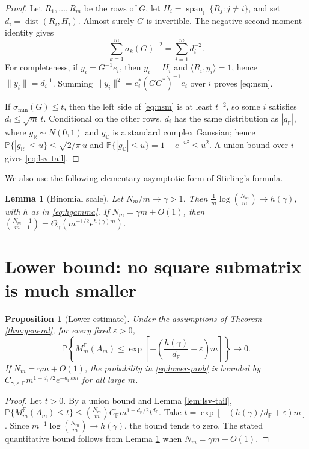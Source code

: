 \documentclass[10pt,a4paper]{amsart}
\newtheorem{proposition}[theorem]{Proposition}
\newtheorem{lemma}[theorem]{Lemma}
\DeclareMathOperator{\dist}{dist}
\newcommand{\R}{\mathbb{R}}
\newcommand{\C}{\mathbb{C}}
\newcommand{\F}{\mathbb{F}}
\newcommand{\PP}{\mathbb{P}}
\begin{document}
\begin{proof}
Let $R_1,\ldots,R_m$ be the rows of $G$, let $H_i=\operatorname{span}_\F\{R_j:j\ne i\}$, and set
$d_i=\dist(R_i,H_i)$. Almost surely $G$ is invertible. The negative second moment identity gives
\begin{equation}\label{eq:nsm}
  \sum_{k=1}^m \sigma_k(G)^{-2}=\sum_{i=1}^m d_i^{-2}.
\end{equation}
For completeness, if $y_i=G^{-1}e_i$, then $y_i\perp H_i$ and $\langle R_i,y_i\rangle=1$, hence
$\|y_i\|=d_i^{-1}$. Summing $\|y_i\|^2=e_i^*(GG^*)^{-1}e_i$ over $i$ proves \eqref{eq:nsm}.

If $\sigma_{\min}(G)\le t$, then the left side of \eqref{eq:nsm} is at least $t^{-2}$, so some $i$
satisfies $d_i\le \sqrt m\,t$. Conditional on the other rows, $d_i$ has the same distribution as
$|g_\F|$, where $g_\R\sim N(0,1)$ and $g_\C$ is a standard complex Gaussian; hence
$\PP\{|g_\R|\le u\}\le \sqrt{2/\pi}\,u$ and $\PP\{|g_\C|\le u\}=1-e^{-u^2}\le u^2$. A union bound over
$i$ gives \eqref{eq:lsv-tail}.
\end{proof}

We also use the following elementary asymptotic form of Stirling's formula.

\begin{lemma}[Binomial scale]\label{lem:binomial}
Let $N_m/m\to\gamma>1$. Then $\frac1m\log \binom{N_m}{m}\to h(\gamma)$, with $h$ as in
\eqref{eq:hgamma}. If $N_m=\gamma m+O(1)$, then
$\binom{N_m-1}{m-1}=\Theta_\gamma(m^{-1/2}e^{h(\gamma)m})$.
\end{lemma}

\section{Lower bound: no square submatrix is much smaller}

\begin{proposition}[Lower estimate]\label{prop:lower}
Under the assumptions of Theorem \ref{thm:general}, for every fixed $\varepsilon>0$,
\begin{equation}\label{eq:lower-prob}
  \PP\left\{M_m^\F(A_m)\le \exp\left[-\left(\frac{h(\gamma)}{d_\F}+\varepsilon\right)m\right]\right\}\to0.
\end{equation}
If $N_m=\gamma m+O(1)$, the probability in \eqref{eq:lower-prob} is bounded by
$C_{\gamma,\varepsilon,\F}m^{1+d_\F/2}e^{-d_\F\varepsilon m}$ for all large $m$.
\end{proposition}

\begin{proof}
Let $t>0$. By a union bound and Lemma \ref{lem:lsv-tail},
$\PP\{M_m^\F(A_m)\le t\}\le \binom{N_m}{m} C_\F m^{1+d_\F/2}t^{d_\F}$. Take
$t=\exp[-(h(\gamma)/d_\F+\varepsilon)m]$. Since $m^{-1}\log \binom{N_m}{m}\to h(\gamma)$, the bound
tends to zero. The stated quantitative bound follows from Lemma \ref{lem:binomial} when
$N_m=\gamma m+O(1)$.
\end{proof}
\end{document}
